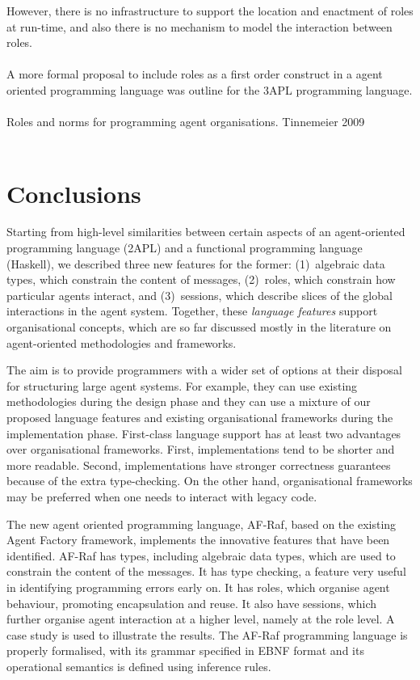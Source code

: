 \documentclass[a4paper,12pt,oneside,fleqn]{book} %
\theoremstyle{plain}
\theoremstyle{definition}
\theoremstyle{remark}
\begin{document}
However, there is no infrastructure to support the location and enactment
of roles at run-time, and also there is no mechanism to model the
interaction between roles. \\~\\ 

A more formal proposal to include roles as a first order construct in a agent
oriented programming language was outline for the 3APL programming language.
\\~\\


Roles and norms for programming agent organisations. Tinnemeier 2009
\\~\\

\chapter{Conclusions}\label{ch:conc} %

Starting from high-level similarities between certain aspects of an
agent-oriented programming language (2APL) and a functional programming
language (Haskell), we described three new features for the former:
(1)~algebraic data types, which constrain the content of messages,
(2)~roles, which constrain how particular agents interact, and
(3)~sessions, which describe slices of the global interactions in the agent
system. Together, these \emph{language features} support organisational
concepts, which are so far discussed mostly in the literature on
agent-oriented methodologies and frameworks.

The aim is to provide programmers with a wider set of options at their disposal
for structuring large agent systems. For example, they can use existing
methodologies during the design phase and they can use a mixture of our
proposed language features and existing organisational frameworks during the
implementation phase. First-class language support has at least two
advantages over organisational frameworks. First, implementations tend to be
shorter and more readable. Second, implementations have stronger correctness
guarantees because of the extra type-checking. On the other hand,
organisational frameworks may be preferred when one needs to interact with
legacy code.

The new agent oriented programming language, AF-Raf, based on the existing
Agent Factory framework, implements the innovative features that have been
identified. AF-Raf has types, including algebraic data types, which are
used to constrain the content of the messages. It has type checking, a
feature very useful in identifying programming errors early on. It has
roles, which organise agent behaviour, promoting encapsulation and reuse.
It also have sessions, which further organise agent interaction at a higher
level, namely at the role level. A case study is used to illustrate the
results.  The AF-Raf programming language is properly formalised, with its
grammar specified in EBNF format and its operational semantics is defined
using inference rules. 



\appendix
\end{document}
